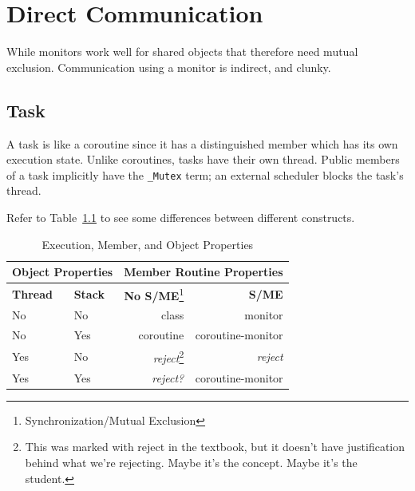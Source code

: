     \chapter{Direct Communication} %
    \label{cha:direct_communication}
        While monitors work well for shared objects that therefore need mutual exclusion.
        Communication using a monitor is indirect, and clunky.

        \section{Task} %
        \label{sec:task}
            A task is like a coroutine since it has a distinguished member which has its own execution state.
            Unlike coroutines, tasks have their own thread.
            Public members of a task implicitly have the \verb|_Mutex| term; an external scheduler blocks the task's thread.

            Refer to Table~\ref{tbl:exec-properties} to see some differences between different constructs.
            \begin{table}[h]
                \caption{Execution, Member, and Object Properties}
                \label{tbl:exec-properties}
                \centering
                \begin{tabular}{| l | l || r | r | }
                    \hline
                    \multicolumn{2}{|c||}{\textbf{Object Properties}} & \multicolumn{2}{|c|}{\textbf{Member Routine Properties}} \\ \hline
                    \textbf{Thread} & \textbf{Stack} & \textbf{No S/ME}\footnote{Synchronization/Mutual Exclusion} & \textbf{S/ME} \\ \hline \hline
                    No & No & class & monitor \\ \hline
                    No & Yes & coroutine  & coroutine-monitor \\ \hline
                    Yes & No & \textit{reject}\footnote{This was marked with reject in the textbook, but it doesn't have justification behind what we're rejecting. Maybe it's the concept. Maybe it's the student.} & \textit{reject} \\ \hline
                    Yes & Yes & \textit{reject?}  & coroutine-monitor \\ \hline
                \end{tabular}
            \end{table}

